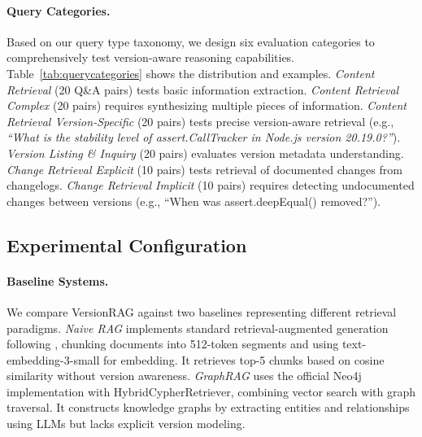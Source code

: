 \paragraph{Query Categories.}
Based on our query type taxonomy, we design six evaluation categories to comprehensively test version-aware reasoning capabilities. Table~\ref{tab:querycategories} shows the distribution and examples. \textit{Content Retrieval} (20 Q\&A pairs) tests basic information extraction. \textit{Content Retrieval Complex} (20 pairs) requires synthesizing multiple pieces of information. \textit{Content Retrieval Version-Specific} (20 pairs) tests precise version-aware retrieval (e.g., \textit{``What is the stability level of assert.CallTracker in Node.js version 20.19.0?''}). \textit{Version Listing \& Inquiry} (20 pairs) evaluates version metadata understanding. \textit{Change Retrieval Explicit} (10 pairs) tests retrieval of documented changes from changelogs. \textit{Change Retrieval Implicit} (10 pairs) requires detecting undocumented changes between versions (e.g., ``When was assert.deepEqual() removed?'').

\begin{table}[hb]
\centering
\small
\caption{Distribution of query categories in VersionQA. 60\% of queries require version-aware reasoning.}
\label{tab:querycategories}
\end{table}

\subsection{Experimental Configuration}

\paragraph{Baseline Systems.}
We compare VersionRAG against two baselines representing different retrieval paradigms. \textit{Naive RAG} implements standard retrieval-augmented generation following \cite{gao2023retrieval}, chunking documents into 512-token segments and using text-embedding-3-small for embedding. It retrieves top-5 chunks based on cosine similarity without version awareness. \textit{GraphRAG} uses the official Neo4j implementation \cite{neo4j_graphrag_docs} with HybridCypherRetriever, combining vector search with graph traversal. It constructs knowledge graphs by extracting entities and relationships using LLMs but lacks explicit version modeling.

